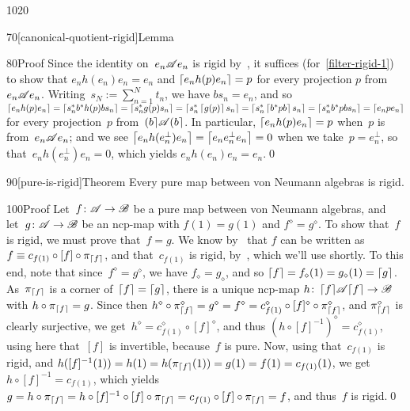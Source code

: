 \begin{parsec}{1020}
\begin{point}{70}[canonical-quotient-rigid]{Lemma}
\begin{point}{80}{Proof}
Since the identity on~$e_n \mathscr{A} e_n$ is rigid
by~,
it suffices (for~\eqref{filter-rigid-1})
to show that 
$e_n h(e_n) e_n = e_n$
and 
$\left\lceil e_nh(p)e_n\right\rceil = p$
for every projection $p$ from $e_n\mathscr{A} e_n$.
Writing~$s_N:=\sum_{n=1}^N t_n$,
we have $bs_n = e_n$,
and so
$
\left\lceil e_n h(p) e_n\right\rceil
=
\left\lceil s_n^* b^* h(p) b s_n\right\rceil
=
\left\lceil s_n^*g(p) s_n\right\rceil
=
\left\lceil s_n^* \left\lceil g(p)\right\rceil s_n\right\rceil
=
\left\lceil s_n^* \left\lceil b^* p b\right\rceil s_n\right\rceil
=
\left\lceil s_n^* b^* p b s_n\right\rceil
=
\left\lceil e_n p e_n \right\rceil
$
for every 
projection~$p$ from~$\left(b\right\rceil\!\mathscr{A}\!\left(b\right\rceil$.
In particular, $\left\lceil e_n h(p)e_n\right\rceil = p$
when~$p$ is from~$e_n \mathscr{A} e_n$;
and we see $\left\lceil e_n h(e_n^\perp) e_n\right\rceil=\left\lceil e_n e_n^\perp e_n\right\rceil=0$
when we take~$p=e_n^\perp$,
so that~$e_n h(e_n^\perp) e_n =0$,
which yields $e_nh(e_n)e_n = e_n$.\qed
\end{point}
\end{point}
\begin{point}{90}[pure-is-rigid]{Theorem}%
Every pure map between von Neumann algebras is rigid.
\begin{point}{100}{Proof}%
Let~$f\colon \mathscr{A}\to\mathscr{B}$ be a pure map between von Neumann algebras,
and let~$g\colon \mathscr{A}\to\mathscr{B}$ be an ncp-map
with $f(1)=g(1)$
and $f^\diamond = g^\diamond$.
To show that~$f$
is rigid,
we must prove that~$f=g$.
We know by~
that $f$ can be written as $f\equiv c_{f(1)} \circ [f]\circ \pi_{\left\lceil f\right\rceil}$,
and that~$c_{f(1)}$ is rigid,
by~,
which we'll use shortly.
To this end,
note that since~$f^\diamond = g^\diamond$,
we have $f_\diamond = g_\diamond$,
and so $\left\lceil f\right\rceil=f_\diamond(1)=g_\diamond(1)=\left\lceil g\right\rceil$.
As~$\pi_{\left\lceil f\right\rceil}$ is a corner of~$\left\lceil f\right\rceil=\left\lceil g\right\rceil$,
there is a unique ncp-map $h\colon \left\lceil f\right\rceil\!\mathscr{A}\!\left\lceil f\right\rceil\to\mathscr{B}$
with $h\circ \pi_{\left\lceil f\right\rceil} =g$. 
Since then
$h^\diamond \circ \pi_{\left\lceil f\right\rceil}^\diamond
= g^\diamond = f^\diamond 
= c_{f(1)}^\diamond
\circ [f]^\diamond \circ \pi_{\left\lceil f\right\rceil}^\diamond$,
 and $\pi_{\left\lceil f\right\rceil}^\diamond$ is clearly surjective,
we get~$h^\diamond = c_{f(1)}^\diamond\circ [f]^\diamond$,
and thus  $(h\circ [f]^{-1})^\diamond = c_{f(1)}^\diamond$,
using here that~$[f]$ is invertible,
because~$f$ is pure.
Now,
using that~$c_{f(1)}$
is rigid,
and $h([f]^{-1}(1))=h(1)=h(\pi_{\left\lceil f\right\rceil}(1))=g(1)=f(1)=c_{f(1)}(1)$,
we get~$h\circ [f]^{-1}=c_{f(1)}$,
which yields
$g=h\circ \pi_{\left\lceil f\right\rceil} 
=h\circ [f]^{-1}\circ [f]\circ \pi_{\left\lceil f\right\rceil}
= c_{f(1)} \circ [f] \circ \pi_{\left\lceil f\right\rceil} = f$,
and thus~$f$ is rigid.\qed
\end{point}
\end{point}
\end{parsec}
